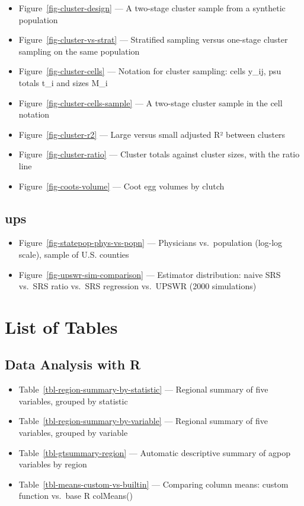 \documentclass[
  letterpaper,
  DIV=11,
  numbers=noendperiod]{scrreprt}
\providecommand{\tightlist}{%
  \setlength{\itemsep}{0pt}\setlength{\parskip}{0pt}}
\renewcommand{\[}{\begin{equation}}
\renewcommand{\]}{\end{equation}}
\begin{document}
\begin{itemize}
\tightlist
\item
  Figure~\ref{fig-cluster-design} --- A two-stage cluster sample from a
  synthetic population
\item
  Figure~\ref{fig-cluster-vs-strat} --- Stratified sampling versus
  one-stage cluster sampling on the same population
\item
  Figure~\ref{fig-cluster-cells} --- Notation for cluster sampling:
  cells y\_ij, psu totals t\_i and sizes M\_i
\item
  Figure~\ref{fig-cluster-cells-sample} --- A two-stage cluster sample
  in the cell notation
\item
  Figure~\ref{fig-cluster-r2} --- Large versus small adjusted R² between
  clusters
\item
  Figure~\ref{fig-cluster-ratio} --- Cluster totals against cluster
  sizes, with the ratio line
\item
  Figure~\ref{fig-coots-volume} --- Coot egg volumes by clutch
\end{itemize}

\subsection{ups}\label{ups}

\begin{itemize}
\tightlist
\item
  Figure~\ref{fig-statepop-phys-vs-popn} --- Physicians vs.~population
  (log-log scale), sample of U.S. counties
\item
  Figure~\ref{fig-upswr-sim-comparison} --- Estimator distribution:
  naive SRS vs.~SRS ratio vs.~SRS regression vs.~UPSWR (2000
  simulations)
\end{itemize}

\section{List of Tables}\label{list-of-tables}

\subsection{Data Analysis with R}\label{data-analysis-with-r-2}

\begin{itemize}
\tightlist
\item
  Table~\ref{tbl-region-summary-by-statistic} --- Regional summary of
  five variables, grouped by statistic
\item
  Table~\ref{tbl-region-summary-by-variable} --- Regional summary of
  five variables, grouped by variable
\item
  Table~\ref{tbl-gtsummary-region} --- Automatic descriptive summary of
  agpop variables by region
\item
  Table~\ref{tbl-means-custom-vs-builtin} --- Comparing column means:
  custom function vs.~base R colMeans()
\end{itemize}
\end{document}
